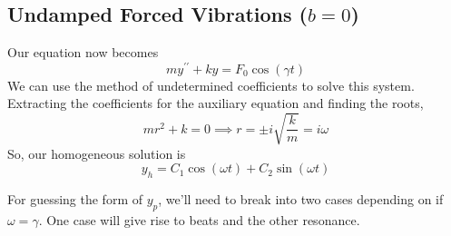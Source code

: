 \subsection{Undamped Forced Vibrations ($b = 0$)}
\noindent
Our equation now becomes
\begin{equation*}
	my^{\prime\prime} + ky = F_0\cos{(\gamma t)}
\end{equation*}
We can use the method of undetermined coefficients to solve this system.\\

\noindent
Extracting the coefficients for the auxiliary equation and finding the roots,
\begin{equation*}
	mr^2 + k = 0 \implies r = \pm i\sqrt{\frac{k}{m}} = i\omega
\end{equation*}
So, our homogeneous solution is
\begin{equation*}
	y_h = C_1\cos{(\omega t)} + C_2\sin{(\omega t)}
\end{equation*}

\noindent
For guessing the form of $y_p$, we'll need to break into two cases depending on if $\omega = \gamma$. One case will give rise to beats and the other resonance.


